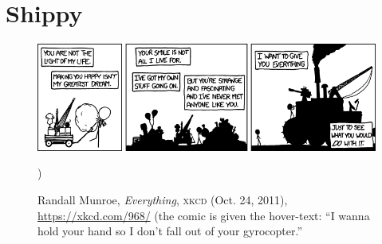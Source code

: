 \documentclass[../FGP.tex]{subfiles}
\begin{document}
\section{Shippy}
\begin{figure}
  \includegraphics[width=\textwidth]{../lib/everything}
  \caption{Randall Munroe, \textit{Everything}, \textsc{xkcd} (Oct. 24, 2011), \url{https://xkcd.com/968/} (the comic is given the hover-text: ``I wanna hold your hand so I don't fall out of your gyrocopter.''})
\end{figure}
\end{document}
